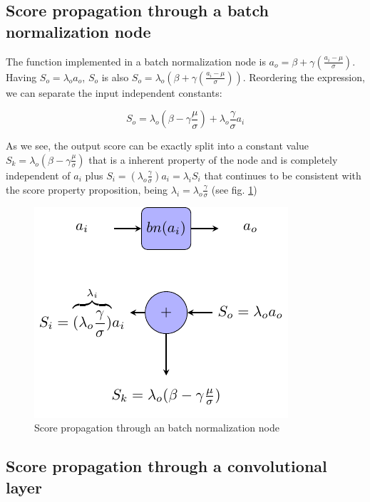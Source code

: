 \documentclass[preprint]{elsarticle}
\theoremstyle{definition} %
\theoremstyle{remark}
\begin{document}
\subsection{Score propagation through a batch normalization node} 

The function implemented in a batch normalization node is $a_o = \beta + \gamma (\frac{a_i - \mu}{\sigma})$. Having $S_o = \lambda_o a_o$, $S_o$ is also $S_o = \lambda_o ( \beta + \gamma (\frac{a_i - \mu}{\sigma}))$. Reordering the expression, we can separate the input independent constants: 

\begin{equation}
	S_o = \lambda_o (\beta - \gamma \frac{\mu}{\sigma}) + \lambda_o \frac{\gamma}{\sigma}a_i
\end{equation}

As we see, the output score can be exactly split into a constant value $S_k = \lambda_o (\beta - \gamma \frac{\mu}{\sigma})$ that is a inherent property of the node and is completely independent of $a_i$ plus $S_i = (\lambda_o \frac{\gamma}{\sigma})a_i = \lambda_i S_i$ that continues to be consistent with the score property proposition, being $\lambda_i = \lambda_o \frac{\gamma}{\sigma}$ (see fig. \ref{fig:score_bn})

\begin{figure}[h!]
	\centering
	\includegraphics{figures/score_bn.pdf}
	\caption{Score propagation through an batch normalization node}
	\label{fig:score_bn}
\end{figure}

\subsection{Score propagation through a convolutional layer}
\end{document}

